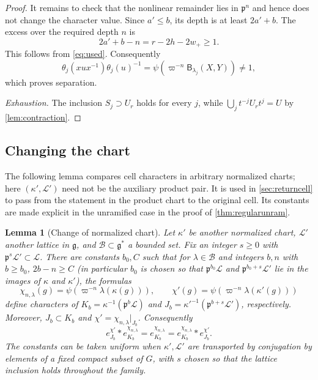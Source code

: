 \documentclass[11pt,reqno]{amsart}
\numberwithin{equation}{section}
\theoremstyle{plain}
\newtheorem{lemma}[theorem]{Lemma}
\theoremstyle{definition}
\theoremstyle{remark}
\theoremstyle{plain}
\newcommand{\pp}{\mathfrak{p}}   %
\newcommand{\Lat}{\mathcal{L}}   %
\newcommand{\g}{\mathfrak{g}}    %
\newcommand{\gd}{\mathfrak{g}^*} %
\newcommand{\lf}{\lambda}
\newcommand{\Bf}{\mathsf{B}}
\newcommand{\nchart}{normalized chart}
\begin{document}
\begin{proof}
It remains to check that the nonlinear remainder lies in $\pp^n$
and hence does not change the character value. Since
$a'\le b$, its depth is at least $2a'+b$. The excess over the
required depth $n$ is
\[
2a'+b-n=r-2h-2w_+\ge1.
\]
This follows from \eqref{eq:used}.
Consequently
\[
\theta_j(xux^{-1})\theta_j(u)^{-1}
=\psi(\varpi^{-n}\Bf_{\lf_j}(X,Y))\ne1,
\]
which proves separation.

\smallskip\noindent\emph{Exhaustion.}
The inclusion $S_j\supset U_r$ holds for every $j$, while
$\bigcup_jt^{-j}U_rt^j=U$ by \cref{lem:contraction}.
\end{proof}


\subsection{Changing the chart}\label{sec:chartchange}
The following lemma compares cell characters in arbitrary normalized
charts; here $(\kappa',\Lat')$ need not be the auxiliary product pair.
It is used in \cref{sec:returncell} to pass from the statement in the
product chart to the original cell. Its constants are made explicit
in the unramified case in the proof of \cref{thm:regularunram}.
\begin{lemma}[Change of \nchart{}]\label{lem:compare}
Let $\kappa'$ be another \nchart{}, $\Lat'$ another
lattice in $\g$, and $\mathcal B\subset\gd$ a bounded set. Fix an integer $s\ge0$
with $\pp^s\Lat'\subset\Lat$. There are constants $b_0,C$ such
that for $\lf\in\mathcal B$ and integers $b,n$ with $b\ge b_0$, $2b-n\ge C$
(in particular $b_0$ is chosen so that $\pp^{b_0}\Lat$ and
$\pp^{b_0+s}\Lat'$ lie in the images of $\kappa$ and $\kappa'$), the formulas
\[
\chi_{n,\lf}(g)=\psi(\varpi^{-n}\lf(\kappa(g))),\qquad
\chi'(g)=\psi(\varpi^{-n}\lf(\kappa'(g)))
\]
define characters of $K_b=\kappa^{-1}(\pp^b\Lat)$ and
$J_b=\kappa'^{-1}(\pp^{b+s}\Lat')$, respectively.
Moreover, $J_b\subset K_b$ and $\chi'=\chi_{n,\lf}|_{J_b}$.
Consequently
\begin{equation}\label{eq:compare}
e_{J_b}^{\chi'}*e_{K_b}^{\chi_{n,\lf}}=e_{K_b}^{\chi_{n,\lf}}=e_{K_b}^{\chi_{n,\lf}}*e_{J_b}^{\chi'}.
\end{equation}
The constants can be taken uniform when $\kappa',\Lat'$ are
transported by conjugation by elements of a fixed compact subset of $G$,
with $s$ chosen so that the lattice inclusion holds throughout the family.
\end{lemma}
\end{document}
